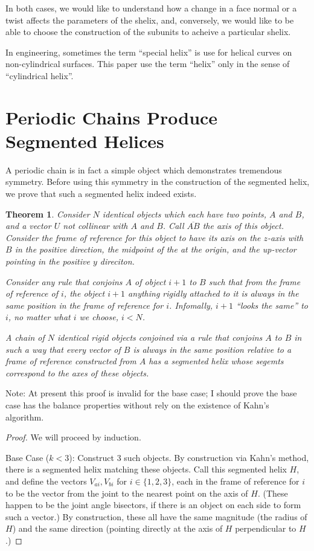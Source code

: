 \documentclass[11pt]{article}
\newtheorem{theorem}{Theorem}
\begin{document}
{In both cases, we would like to understand how a change in a face normal or a twist affects the parameters of the shelix,
and, conversely, we would like to be able to choose the construction of the subunits to acheive a particular shelix.

In engineering, sometimes the term ``special helix''\cite{gu2012research} is use for helical curves on non-cylindrical surfaces. This paper use the term ``helix'' only in the sense of ``cylindrical helix''.

\section{Periodic Chains Produce Segmented Helices}

A periodic chain is in fact a simple object which demonstrates tremendous symmetry.
Before using this symmetry in the construction of the segmented helix, we
prove that such a segmented helix indeed exists.

\begin{theorem}
  Consider $N$ identical objects which each have two points, $A$ and $B$,
  and a vector $U$ not collinear with $A$ and $B$. Call
  $\overline{AB}$ the axis of this object.
  Consider the frame of reference for this object to have
  its axis on the $z$-axis with $B$ in the positive direction, the
  midpoint of the at the origin, and the up-vector pointing in the positive $y$ direciton.

  Consider any rule that conjoins $A$ of object $i+1$ to $B$ such that
  from the frame of reference of $i$, the object $i+1$ anything rigidly
  attached to it is always in the same position in the frame of reference for $i$.
  Infomally, $i+1$ ``looks the same'' to $i$, no matter what $i$ we choose, $i < N$.

  A chain of $N$ identical rigid objects conjoined via a rule that
  conjoins $A$ to $B$ in such a way that every vector 
  of $B$ is always in the same position relative to a frame of reference
  constructed from $A$ has a segmented helix whose segemts correspond
  to the axes of these objects.
\end{theorem}

Note: At present this proof is invalid for the base case; I should prove the
base case has the balance properties without rely on the existence of Kahn's algorithm.
\begin{proof}
  We will proceed by induction.

  Base Case ($k < 3$):
  Construct 3 such objects. By construction via Kahn's method, there is
  a segmented helix matching these objects. Call this segmented helix $H$,
  and define the  vectors
  $V_{ai}, V_{bi}$ for $i \in \{1,2,3\}$, each in the frame of reference
  for $i$ to be the vector from the joint to the nearest point on the
  axis of $H$. (These happen to be the joint angle bisectors, if there is an object on
  each side to form such a vector.)
  By construction, these all have the same magnitude (the radius
  of $H$) and the same direction (pointing directly at the axis of $H$
  perpendicular to $H$.)


\end{proof}}
\end{document}
